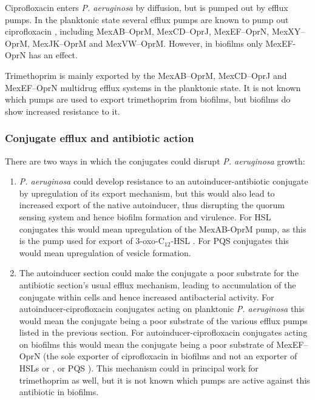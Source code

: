 Ciprofloxacin  enters \textit{P. aeruginosa} by diffusion\cite{Celesk1989}, but is pumped out by efflux pumps\cite{Poole2000}. In the planktonic state several efflux pumps are known to pump out ciprofloxacin , including MexAB–OprM, MexCD–OprJ, MexEF–OprN, MexXY–OprM, MexJK–OprM and MexVW–OprM\cite{Poole2004}. 
However, in biofilms only MexEF-OprN has an effect\cite{DeKievit2001}.

Trimethoprim  is mainly exported by the MexAB–OprM\cite{Kohler1996}, MexCD–OprJ\cite{Poole1996} and MexEF–OprN\cite{Kohler1997} multidrug efflux systems\cite{Poole2001,Poole2004} in the planktonic state. It is not known which pumps are used to export trimethoprim  from biofilms, but biofilms do show increased resistance to it\cite{Olson2002}.

\subsubsection{Conjugate efflux and antibiotic action\label{sec:conj_eff}}

There are two ways in which the conjugates could disrupt \textit{P. aeruginosa} growth:

\begin{enumerate}

\item \textit{P. aeruginosa} could develop resistance to an autoinducer-antibiotic conjugate by upregulation of its export mechanism, but this would also lead to increased export of the native autoinducer, thus disrupting the quorum sensing system and hence biofilm formation and virulence\cite{Dubern2008,Davies1998,Evans1998}.
For HSL conjugates this would mean upregulation of the MexAB-OprM pump, as this is the pump used for export of 3-oxo-C$_{12}$-HSL \cite{Evans1998,Poole2004}.
For PQS conjugates this would mean upregulation of vesicle formation\cite{Florez2017}.

\item The autoinducer section could make the conjugate a poor substrate for  the antibiotic section's usual efflux mechanism, leading to accumulation of the conjugate within cells and hence increased antibacterial activity. 
For autoinducer-ciprofloxacin conjugates acting on planktonic \textit{P. aeruginosa} this would mean the conjugate being a poor substrate of the various efflux pumps listed in the previous section.
For autoinducer-ciprofloxacin conjugates acting on biofilms this would mean the conjugate being a poor substrate of MexEF–OprN (the sole exporter of ciprofloxacin  in biofilms\cite{DeKievit2001} and not an exporter of HSLs  or , or PQS \cite{Poole2004}).
This mechanism could in principal work for trimethoprim  as well, but it is not known which pumps are active against this antibiotic in biofilms. 

\end{enumerate}





